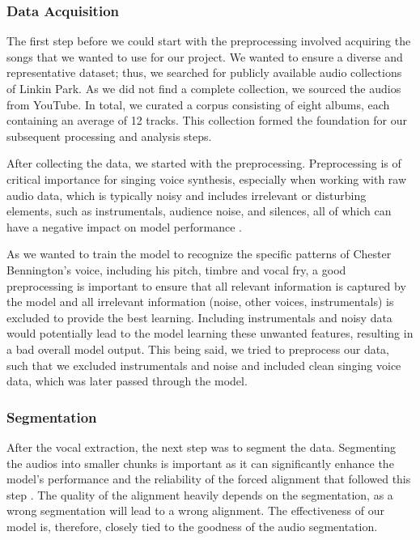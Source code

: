 \documentclass[a4paper]{article}
\begin{document}
	\subsubsection{Data Acquisition}
	The first step before we could start with the preprocessing involved acquiring the songs that we wanted to use for our project. We wanted to ensure a diverse and representative dataset; thus, we searched for publicly available audio collections of Linkin Park. As we did not find a complete collection, we sourced the audios from YouTube. In total, we curated a corpus consisting of eight albums, each containing an average of 12 tracks. This collection formed the foundation for our subsequent processing and analysis steps.
	
	After collecting the data, we started with the preprocessing. Preprocessing is of critical importance for singing voice synthesis, especially when working with raw audio data, which is typically noisy and includes irrelevant or disturbing elements, such as instrumentals, audience noise, and silences, all of which can have a negative impact on model performance \cite{Kulkarni2023}.
	
	As we wanted to train the model to recognize the specific patterns of Chester Bennington’s voice, including his pitch, timbre and vocal fry, a good preprocessing is important to ensure that all relevant information is captured by the model and all irrelevant information (noise, other voices, instrumentals) is excluded to provide the best learning. Including instrumentals and noisy data would potentially lead to the model learning these unwanted features, resulting in a bad overall model output. This being said, we tried to preprocess our data, such that we excluded instrumentals and noise and included clean singing voice data, which was later passed through the model.
	
	
	\subsubsection{Segmentation}
	After the vocal extraction, the next step was to segment the data. Segmenting the audios into smaller chunks is important as it can significantly enhance the model’s performance and the reliability of the forced alignment that followed this step \cite{Rybach2009}. The quality of the alignment heavily depends on the segmentation, as a wrong segmentation will lead to a wrong alignment. The effectiveness of our model is, therefore, closely tied to the goodness of the audio segmentation. 
	
\end{document}
